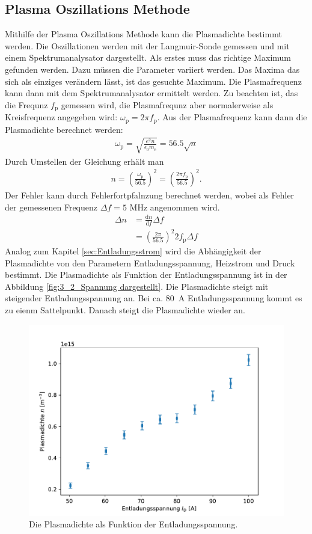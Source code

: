 \subsection{Plasma Oszillations Methode}
Mithilfe der Plasma  Oszillations Methode kann die Plasmadichte bestimmt werden. Die Oszillationen werden mit der Langmuir-Sonde gemessen und mit einem Spektrumanalysator dargestellt. Als erstes muss das richtige Maximum gefunden werden. Dazu müssen die Parameter variiert werden. Das Maxima das sich als einziges verändern lässt, ist das gesuchte Maximum. Die Plasmafrequenz kann dann mit dem Spektrumanalysator ermittelt werden. Zu beachten ist, das die Frequnz $f_{\mathrm{p}}$ gemessen wird, die Plasmafrequnz aber normalerweise als Kreisfrequenz angegeben wird: $\omega_{\mathrm{p}}= 2 \pi f_{\mathrm{p}}$.  Aus der Plasmafrequenz  kann dann die Plasmadichte berechnet werden:
\begin{align}
  \omega_{\mathrm{p}}=\sqrt{\frac{e^2 n}{\epsilon_0 m_{\mathrm{e}}}} = 56.5 \sqrt{n}
\end{align}
Durch Umstellen der Gleichung erhält man
\begin{align}
  n=\left( \frac{\omega_{\mathrm{p}}}{56.5} \right)^2=\left( \frac{2 \pi f_{\mathrm{p}}}{56.5} \right)^2.
 \end{align}
Der Fehler kann durch Fehlerfortpfalnzung berechnet werden, wobei als Fehler der gemessenen Frequenz  $\Delta f= 5$ MHz angenommen wird.  
\begin{align}
  \Delta n &= \frac{\mathrm{d} n}{\mathrm{d} f} \Delta f \\
  &=\left( \frac{2 \pi}{56.5} \right)^2 2 f_{\mathrm{p}} \Delta f
\end{align}
Analog zum Kapitel \ref{sec:Entladungsstrom} wird die Abhängigkeit der Plasmadichte von den Parametern Entladungsspannung, Heizstrom und Druck bestimmt. Die Plasmadichte als Funktion der Entladungsspannung ist in der Abbildung \ref{fig:3_2_Spannung dargestellt}. Die Plasmadichte steigt mit steigender Entladungsspannung an. Bei ca. \SI{80}{A} Entladungsspannung kommt es zu eienm Sattelpunkt. Danach steigt die Plasmadichte wieder an. 
\begin{figure}[H]
\centering
\includegraphics[scale=0.6]{3_2_Spannung.pdf}
\caption{Die Plasmadichte  als Funktion der Entladungsspannung.}
\label{fig:3_2_Spannung}
\end{figure}
